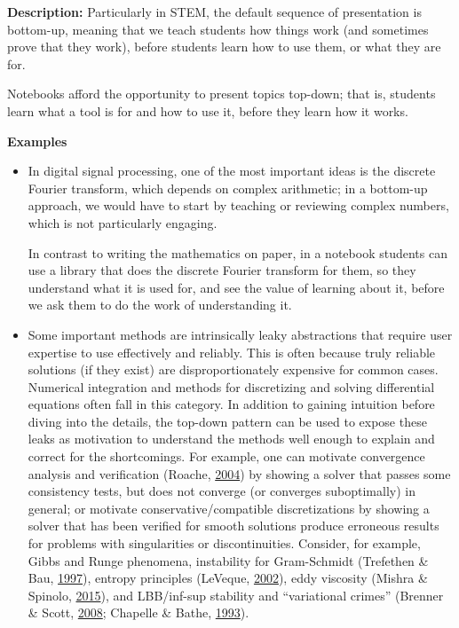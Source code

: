 \documentclass[]{book}
\begin{document}
\textbf{Description:}
Particularly in STEM, the default sequence of presentation is
bottom-up, meaning that we teach students how things work (and
sometimes prove that they work), before students learn how to use
them, or what they are for.

Notebooks afford the opportunity to present topics top-down; that is,
students learn what a tool is for and how to use it, before they learn
how it works.

\textbf{Examples}

\begin{itemize}
\item
  In digital signal processing, one of the most important ideas is the discrete
  Fourier transform, which depends on complex arithmetic; in a bottom-up
  approach, we would have to start by teaching or reviewing complex numbers,
  which is not particularly engaging.

  In contrast to writing the mathematics on paper, in a notebook students can
  use a library that does the discrete Fourier transform for them, so they
  understand what it is used for, and see the value of learning about it, before
  we ask them to do the work of understanding it.
\item
  Some important methods are intrinsically leaky abstractions that require user
  expertise to use effectively and reliably. This is often because truly
  reliable solutions (if they exist) are disproportionately expensive for common
  cases. Numerical integration and methods for discretizing and solving
  differential equations often fall in this category. In addition to gaining
  intuition before diving into the details, the top-down pattern can be used to
  expose these leaks as motivation to understand the methods well enough to
  explain and correct for the shortcomings. For example, one can motivate
  convergence analysis and verification (Roache, \protect\hyperlink{ref-roache2004bpc}{2004}) by showing a solver
  that passes some consistency tests, but does not converge (or converges
  suboptimally) in general; or motivate conservative/compatible discretizations
  by showing a solver that has been verified for smooth solutions produce
  erroneous results for problems with singularities or discontinuities.
  Consider, for example, Gibbs and Runge phenomena, instability for
  Gram-Schmidt (Trefethen \& Bau, \protect\hyperlink{ref-trefethen1997numerical}{1997}), entropy principles
  (LeVeque, \protect\hyperlink{ref-leveque2002finite}{2002}), eddy viscosity (Mishra \& Spinolo, \protect\hyperlink{ref-mishra2015accurate}{2015}), and LBB/inf-sup
  stability and ``variational crimes''
  (Brenner \& Scott, \protect\hyperlink{ref-brenner2008mathematical}{2008}; Chapelle \& Bathe, \protect\hyperlink{ref-chapelle1993inf}{1993}).
\end{itemize}
\end{document}

